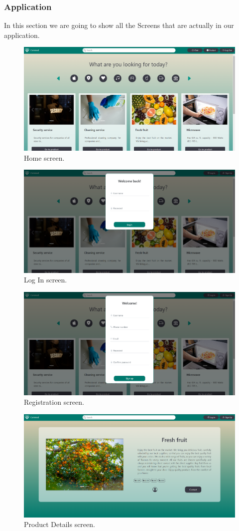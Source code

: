 \documentclass[./main.tex]{subfiles}
\begin{document}
\subsubsection{Application}
In this section we are going to show all the Screens that are actually in our application.
\begin{figure}[H]
  \centering
  \includegraphics[width=0.5\linewidth]{img/webclient_2.png}
  \caption{Home screen.}
  \label{fig:webclient-screen-1}
\end{figure}
\begin{figure}[H]
  \centering
  \includegraphics[width=0.5\linewidth]{img/webclient_3.png}
  \caption{Log In screen.}
  \label{fig:webclient-screen-2}
\end{figure}
\begin{figure}[H]
  \centering
  \includegraphics[width=0.5\linewidth]{img/webclient_4.png}
  \caption{Registration screen.}
  \label{fig:webclient-screen-3}
\end{figure}
\begin{figure}[H]
  \centering
  \includegraphics[width=0.5\linewidth]{img/webclient_5.png}
  \caption{Product Details screen.}
  \label{fig:webclient-screen-4}
\end{figure}
\end{document}
